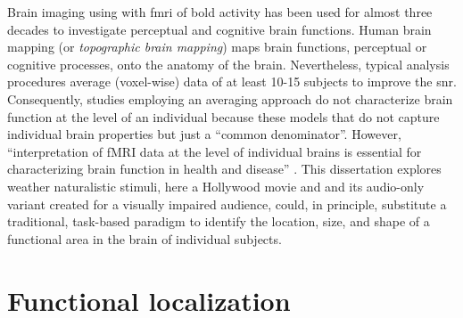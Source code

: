 

%
Brain imaging using with \ac{fmri} of \ac{bold} activity has been used for
almost three decades to investigate perceptual and cognitive brain functions.
%
Human brain mapping (or \textit{topographic brain mapping}) maps brain
functions, perceptual or cognitive processes, onto the anatomy of the brain.
%
Nevertheless, typical analysis procedures average (voxel-wise) data of at least
10-15 subjects to improve the \ac{snr}.
%
Consequently, studies employing an averaging approach do not characterize brain
function at the level of an individual because these models that do not capture
individual brain properties but just a ``common denominator''. 
%
However, ``interpretation of fMRI data at the level of individual brains is
essential for characterizing brain function in health and disease''
\citep{dubois2016building}.
%
This dissertation explores weather naturalistic stimuli, here a Hollywood movie
and and its audio-only variant created for a visually impaired audience, could,
in principle, substitute a traditional, task-based paradigm to identify the
location, size, and shape of a functional area in the brain of individual
subjects.


\section{Functional localization}




